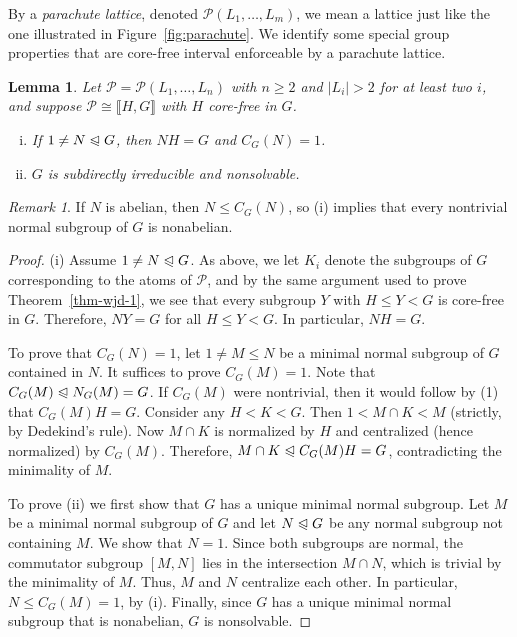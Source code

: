 \documentclass{gen-j-l}
\newcommand{\lb}{\ensuremath{\llbracket}}
\newcommand{\rb}{\ensuremath{\rrbracket}}
\newcommand{\<}{\ensuremath{\langle}}
\renewcommand{\>}{\ensuremath{\rangle}}
\theoremstyle{plain}
\newtheorem{lemma}[theorem]{Lemma}
\theoremstyle{definition}
\theoremstyle{remark}
\newtheorem*{remark}{Remark}
\numberwithin{theorem}{section}
\numberwithin{claim}{section}
\numberwithin{equation}{section}
\numberwithin{conjecture}{section}
\renewcommand{\leq}{\ensuremath{\leqslant}}
\renewcommand{\geq}{\ensuremath{\geqslant}}
\newcommand{\subnormal}{\ensuremath{\trianglelefteqslant}}
\newcommand{\2}{\ensuremath{\mathbf{2}}}
\newcommand{\3}{\ensuremath{\mathbf{3}}}
\newcommand{\sP}{\ensuremath{\mathscr{P}}}
\begin{document}
By a \emph{parachute lattice}, denoted $\sP(L_1, \dots, L_m)$,
we mean a lattice just like the one illustrated in 
Figure~\ref{fig:parachute}.
We identify some special group properties that are core-free interval
enforceable by a parachute lattice.
\begin{lemma}
\label{lemma-wjd-5}
 Let $\sP = \sP(L_1, \dots, L_n)$ with $n\geq 2$ and $|L_i|>2$ for at least two 
$i$, and suppose $\sP \cong \lb H, G \rb$ with $H$ core-free in $G$.  
\begin{enumerate}[(i)]
\item If $1\neq N \subnormal G$, then $NH = G$ and $C_G(N)=1$.
\item $G$ is subdirectly irreducible and nonsolvable.
\end{enumerate}
\end{lemma}
\begin{remark}
If $N$ is abelian, then $N \leq C_G(N)$, so (i) implies
that every nontrivial normal subgroup of $G$ is nonabelian.  
\end{remark}
\begin{proof}
(i)
Assume $1\neq N \subnormal G$. 
As above, we let $K_i$
denote the subgroups of $G$ corresponding to the atoms of $\sP$, and by the
same argument used to prove Theorem~\ref{thm-wjd-1},
we see that every subgroup $Y$ with $H \leq Y < G$ is core-free in $G$.  
Therefore, $NY=G$ for all $H \leq Y < G$. In particular, $NH=G$. 

To prove that $C_G(N)=1$, let $1\neq M \leq N$ be a minimal normal subgroup of
$G$ contained in $N$.  It suffices to prove $C_G(M)= 1$.
Note that $C_G(M) \subnormal N_G(M) =G$.  If $C_G(M)$ were nontrivial, then it
would follow by (1) that $C_G(M)H = G$.
Consider any $H< K < G$. Then $1 < M\cap K < M$ (strictly, by
Dedekind's rule). Now $M\cap K$ is normalized by $H$ and centralized
(hence normalized) by $C_G(M)$.  
Therefore, $M\cap K \subnormal C_G(M)H = G$, contradicting the minimality of
$M$.  

To prove (ii) we first show that $G$ has a unique minimal normal subgroup.  Let
$M$ be a minimal
normal subgroup of $G$ and let $N \subnormal G$ be any normal subgroup not 
containing $M$.  We show that $N = 1$.  Since both subgroups
are normal, the commutator subgroup
$[M,N]$
lies in the intersection $M\cap N$, which is trivial by the minimality of $M$.   
Thus, $M$ and $N$ centralize each other.  In particular,
$N \leq C_G(M) = 1$, by (i).
Finally, since $G$ has a unique minimal normal subgroup that is nonabelian, $G$
is nonsolvable.
\end{proof}
\end{document}
